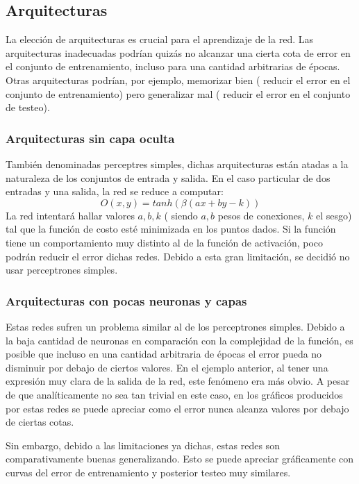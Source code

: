 \documentclass[%
    final,
    reprint,
    notitlepage,
    narroweqnarray,
    inline,
    twoside,
    invited
    ]{ieee}
\begin{document}
\subsection{Arquitecturas}

\par  La elección de arquitecturas es crucial para el aprendizaje de la red. Las arquitecturas inadecuadas podrían quizás no 
alcanzar una cierta cota de error en el conjunto de entrenamiento, incluso para una cantidad arbitrarias de épocas. Otras 
arquitecturas podrían, por ejemplo, memorizar bien ( reducir el error en el conjunto de entrenamiento) pero generalizar 
mal ( reducir el error en el conjunto de testeo).

\subsubsection{Arquitecturas sin capa oculta}

También denominadas perceptres simples, dichas arquitecturas están atadas a la naturaleza de los conjuntos de entrada 
y salida. En el caso particular de dos entradas y una salida, la red se reduce a computar:
\begin{equation}
O(x,y) = tanh(\beta (ax+by - k))
\end{equation}
La red intentará hallar valores $a,b,k$ ( siendo $a,b$ pesos de conexiones, $k$ el sesgo) 
tal que la función de costo esté minimizada en los puntos dados. Si la función 
tiene un comportamiento muy distinto al de la función de activación, poco podrán reducir el error dichas redes. 
Debido a esta gran limitación, se decidió no usar perceptrones simples.

\subsubsection{Arquitecturas con pocas neuronas y capas}

\par Estas redes sufren un problema similar al de los perceptrones simples. Debido a la baja cantidad de neuronas 
en comparación con la complejidad de la función, es posible que incluso en una cantidad arbitraria de épocas 
el error pueda no disminuir por debajo de ciertos valores. En el ejemplo anterior, al tener una expresión muy 
clara de la salida de la red, este fenómeno era más obvio. A pesar de que analíticamente no sea tan trivial en este caso, 
en los gráficos producidos por estas redes se puede apreciar como el error nunca alcanza valores por debajo de 
ciertas cotas. 
\par Sin embargo, debido a las limitaciones ya dichas, estas redes son comparativamente buenas generalizando. Esto 
se puede apreciar gráficamente con curvas del error de entrenamiento y posterior testeo muy similares. 
\end{document}
